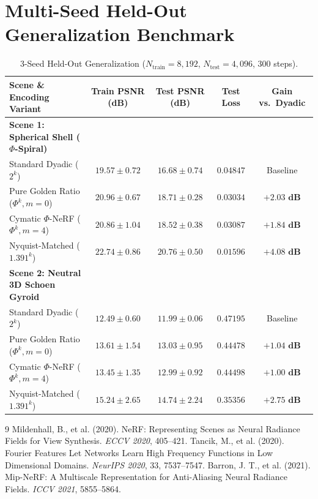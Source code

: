 \documentclass[11pt,a4paper]{article}
\begin{document}
\section{Multi-Seed Held-Out Generalization Benchmark}
\begin{table}[h!]
\centering
\caption{3-Seed Held-Out Generalization ($N_{\mathrm{train}} = 8,192$, $N_{\mathrm{test}} = 4,096$, $300$ steps).}
\vspace{0.2cm}
\begin{tabular}{lcccc}
\toprule
Scene \& Encoding Variant & Train PSNR (dB) & Test PSNR (dB) & Test Loss & Gain vs.\ Dyadic \\
\midrule
\textbf{Scene 1: Spherical Shell ($\Phi$-Spiral)} & & & & \\
Standard Dyadic ($2^k$) & $19.57 \pm 0.72$ & $16.68 \pm 0.74$ & $0.04847$ & Baseline \\
Pure Golden Ratio ($\Phi^k, m=0$) & $20.96 \pm 0.67$ & $\mathbf{18.71 \pm 0.28}$ & $0.03034$ & $\mathbf{+2.03\text{ dB}}$ \\
Cymatic $\Phi$-NeRF ($\Phi^k, m=4$) & $20.86 \pm 1.04$ & $\mathbf{18.52 \pm 0.38}$ & $0.03087$ & $\mathbf{+1.84\text{ dB}}$ \\
Nyquist-Matched ($1.391^k$) & $22.74 \pm 0.86$ & $\mathbf{20.76 \pm 0.50}$ & $0.01596$ & $\mathbf{+4.08\text{ dB}}$ \\
\midrule
\textbf{Scene 2: Neutral 3D Schoen Gyroid} & & & & \\
Standard Dyadic ($2^k$) & $12.49 \pm 0.60$ & $11.99 \pm 0.06$ & $0.47195$ & Baseline \\
Pure Golden Ratio ($\Phi^k, m=0$) & $13.61 \pm 1.54$ & $\mathbf{13.03 \pm 0.95}$ & $0.44478$ & $\mathbf{+1.04\text{ dB}}$ \\
Cymatic $\Phi$-NeRF ($\Phi^k, m=4$) & $13.45 \pm 1.35$ & $\mathbf{12.99 \pm 0.92}$ & $0.44498$ & $\mathbf{+1.00\text{ dB}}$ \\
Nyquist-Matched ($1.391^k$) & $15.24 \pm 2.65$ & $\mathbf{14.74 \pm 2.24}$ & $0.35356$ & $\mathbf{+2.75\text{ dB}}$ \\
\bottomrule
\end{tabular}
\end{table}

\begin{thebibliography}{9}
 Mildenhall, B., et al. (2020). NeRF: Representing Scenes as Neural Radiance Fields for View Synthesis. \textit{ECCV 2020}, 405--421.
 Tancik, M., et al. (2020). Fourier Features Let Networks Learn High Frequency Functions in Low Dimensional Domains. \textit{NeurIPS 2020}, 33, 7537--7547.
 Barron, J. T., et al. (2021). Mip-NeRF: A Multiscale Representation for Anti-Aliasing Neural Radiance Fields. \textit{ICCV 2021}, 5855--5864.
\end{thebibliography}
\end{document}
